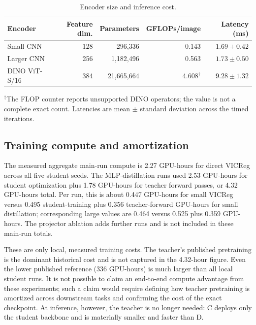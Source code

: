 \documentclass[10pt]{article}
\begin{document}
\begin{table}[H]
\centering
\caption{Encoder size and inference cost.}
\label{tab:cost}
\small
\begin{tabular}{lrrrr}
\toprule
Encoder & Feature dim. & Parameters & GFLOPs/image & Latency (ms) \\
\midrule
Small CNN & 128 & 296,336 & 0.143 & $1.69\pm0.42$ \\
Larger CNN & 256 & 1,182,496 & 0.563 & $1.73\pm0.50$ \\
DINO ViT-S/16 & 384 & 21,665,664 & 4.608$^\dagger$ & $9.28\pm1.32$ \\
\bottomrule
\end{tabular}

\vspace{0.3em}
\begin{minipage}{0.95\linewidth}
\footnotesize
$^\dagger$The FLOP counter reports unsupported DINO operators; the value is
not a complete exact count. Latencies are mean $\pm$ standard deviation
across the timed iterations.
\end{minipage}
\end{table}

\subsection{Training compute and amortization}

The measured aggregate main-run compute is 2.27 GPU-hours for direct
VICReg across all five student seeds. The MLP-distillation runs used 2.53
GPU-hours for student optimization plus 1.78 GPU-hours for teacher
forward passes, or 4.32 GPU-hours total. Per run, this is about 0.447
GPU-hours for small VICReg versus 0.495 student-training plus 0.356
teacher-forward GPU-hours for small distillation; corresponding large
values are 0.464 versus 0.525 plus 0.359 GPU-hours. The projector ablation
adds further runs and is not included in these main-run totals.

These are only local, measured training costs. The teacher's published
pretraining is the dominant historical cost and is not captured in the
4.32-hour figure. Even the lower published reference (336 GPU-hours) is
much larger than all local student runs. It is not possible to claim an
end-to-end compute advantage from these experiments; such a claim would
require defining how teacher pretraining is amortized across downstream
tasks and confirming the cost of the exact checkpoint. At inference,
however, the teacher is no longer needed: C deploys only the student
backbone and is materially smaller and faster than D.
\end{document}
